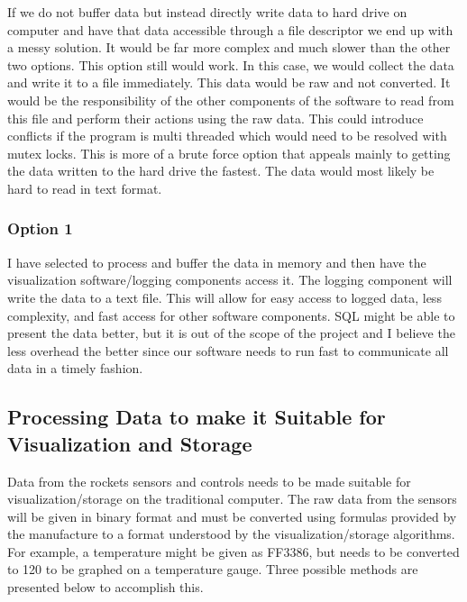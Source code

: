 \documentclass[10pt,draftclsnofoot,onecolumn,retainorgcmds]{IEEEtran}
\begin{document}
If we do not buffer data but instead directly write data to hard drive on computer and have that data accessible through a file descriptor we end up with a messy solution. It would be far more complex and much slower than the other two options. This option still would work. In this case, we would collect the data and write it to a file immediately. This data would be raw and not converted. It would be the responsibility of the other components of the software to read from this file and perform their actions using the raw data. This could introduce conflicts if the program is multi threaded which would need to be resolved with mutex locks. This is more of a brute force option that appeals mainly to getting the data written to the hard drive the fastest. The data would most likely be hard to read in text format.\\

\subsubsection{Option 1}
I have selected to process and buffer the data in memory and then have the visualization software/logging components access it. The logging component will write the data to a text file. This will allow for easy access to logged data, less complexity, and fast access for other software components. SQL might be able to present the data better, but it is out of the scope of the project and I believe the less overhead the better since our software needs to run fast to communicate all data in a timely fashion.\\

\subsection{Processing Data to make it Suitable for Visualization and Storage}
Data from the rockets sensors and controls needs to be made suitable for visualization/storage on the traditional computer. The raw data from the sensors will be given in binary format and must be converted using formulas provided by the manufacture to a format understood by the visualization/storage algorithms. For example, a temperature might be given as FF3386, but needs to be converted to 120 to be graphed on a temperature gauge. Three possible methods are presented below to accomplish this.\\
\end{document}

